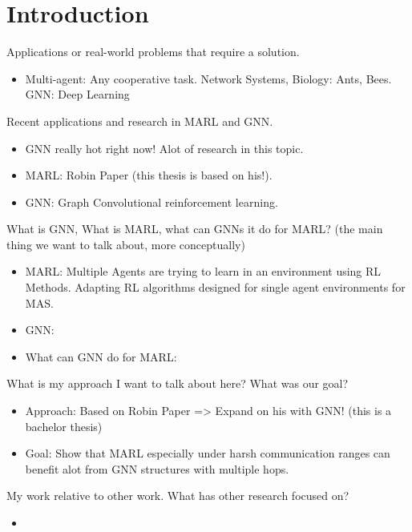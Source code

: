 
\chapter{Introduction}
Applications or real-world problems that require a solution. 
\begin{itemize}[noitemsep,nolistsep]
	\item  Multi-agent: Any cooperative task. Network Systems, Biology: Ants, Bees. GNN: Deep Learning
\end{itemize} \par

Recent applications and research in MARL and GNN.
\begin{itemize}[noitemsep,nolistsep]
	\item GNN really hot right now! Alot of research in this topic.
	\item MARL: Robin Paper (this thesis is based on his!). 
	\item GNN: Graph Convolutional reinforcement learning.
\end{itemize} \par

What is GNN, What is MARL, what can GNNs it do for MARL? (the main thing we want to talk about, more conceptually)
\begin{itemize}[noitemsep,nolistsep]
	\item MARL: Multiple Agents are trying to learn in an environment using RL Methods. Adapting RL algorithms designed for single agent environments for MAS.
	\item GNN: 
	\item What can GNN do for MARL:
\end{itemize} \par

What is my approach I want to talk about here? What was our goal?
\begin{itemize}[noitemsep,nolistsep]
	\item Approach: Based on Robin Paper => Expand on his with GNN! (this is a bachelor thesis)
	\item Goal: Show that MARL especially under harsh communication ranges can benefit alot from GNN structures with multiple hops.
\end{itemize} \par

My work relative to other work. What has other research focused on?
\begin{itemize}[noitemsep,nolistsep]
	\item 
\end{itemize} \par

